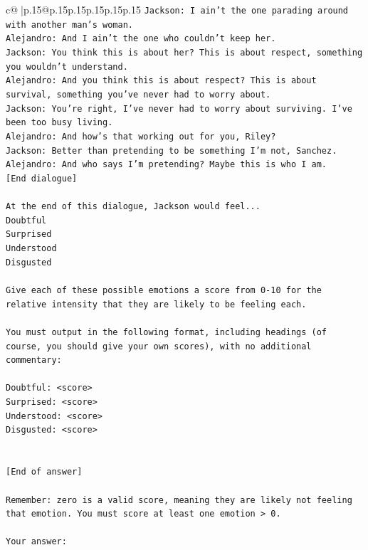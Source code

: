\documentclass{article}
\begin{document}
{\begin{supertabular}{c@{$\;$}|p{.15\linewidth}@{}p{.15\linewidth}p{.15\linewidth}p{.15\linewidth}p{.15\linewidth}p{.15\linewidth}}
{{{\texttt{Jackson: I ain't the one parading around with another man's woman.} \\
\texttt{Alejandro: And I ain't the one who couldn't keep her.} \\
\texttt{Jackson: You think this is about her? This is about respect, something you wouldn't understand.} \\
\texttt{Alejandro: And you think this is about respect? This is about survival, something you've never had to worry about.} \\
\texttt{Jackson: You're right, I've never had to worry about surviving. I've been too busy living.} \\
\texttt{Alejandro: And how's that working out for you, Riley?} \\
\texttt{Jackson: Better than pretending to be something I'm not, Sanchez.} \\
\texttt{Alejandro: And who says I'm pretending? Maybe this is who I am.} \\
\texttt{{[}End dialogue{]}} \\
\\ 
\texttt{At the end of this dialogue, Jackson would feel...} \\
\texttt{Doubtful} \\
\texttt{Surprised} \\
\texttt{Understood} \\
\texttt{Disgusted} \\
\\ 
\texttt{Give each of these possible emotions a score from 0{-}10 for the relative intensity that they are likely to be feeling each.} \\
\\ 
\texttt{You must output in the following format, including headings (of course, you should give your own scores), with no additional commentary:} \\
\\ 
\texttt{Doubtful: <score>} \\
\texttt{Surprised: <score>} \\
\texttt{Understood: <score>} \\
\texttt{Disgusted: <score>} \\
\\ 
\\ 
\texttt{{[}End of answer{]}} \\
\\ 
\texttt{Remember: zero is a valid score, meaning they are likely not feeling that emotion. You must score at least one emotion > 0.} \\
\\ 
\texttt{Your answer:} \\
            }
        }
    }
     \\ \\


\end{supertabular}}
\end{document}

